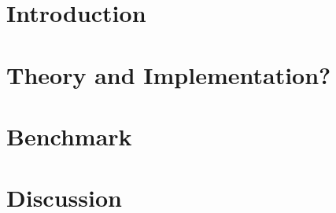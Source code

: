 \documentclass[a4paper,10pt]{article}
\title{\TODO{blubb}}
\author{Falco Kirchner, Nancy Retzlaff, Peter F. Stadler}
\newcommand{\TODO}[1]{\begingroup\color{red}#1\endgroup}
\begin{document}
\maketitle

\begin{abstract}
 \TODO{fancy abstract}
\end{abstract}

\section{Introduction}

\section{Theory and Implementation?}

\section{Benchmark}

\section{Discussion}


\label{Bibliography}
 

\end{document}
